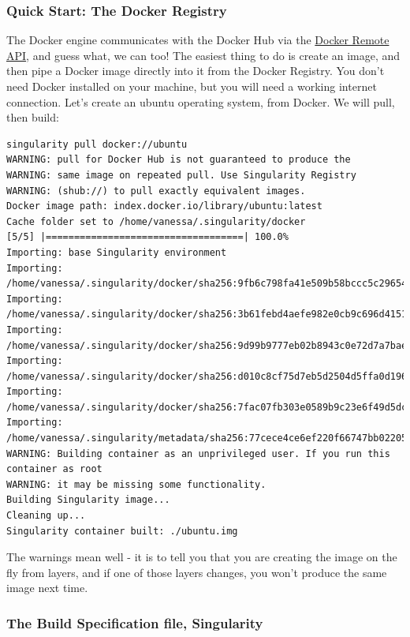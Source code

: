 \documentclass[a4paper]{article}
\begin{document}
\subsubsection{Quick Start: The Docker Registry}

The Docker engine communicates with the Docker Hub via the \href{https://docs.docker.com/engine/reference/api/docker_remote_api/}{Docker Remote API}, and guess what, we can too! The easiest thing to do is create an image, and then pipe a Docker image directly into it from the Docker Registry. You don’t need Docker installed on your machine, but you will need a working internet connection. Let’s create an ubuntu operating system, from Docker. We will pull, then build:\\[0.1in]

\begin{lstlisting}[frame=single] 
singularity pull docker://ubuntu
WARNING: pull for Docker Hub is not guaranteed to produce the
WARNING: same image on repeated pull. Use Singularity Registry
WARNING: (shub://) to pull exactly equivalent images.
Docker image path: index.docker.io/library/ubuntu:latest
Cache folder set to /home/vanessa/.singularity/docker
[5/5] |===================================| 100.0% 
Importing: base Singularity environment
Importing: /home/vanessa/.singularity/docker/sha256:9fb6c798fa41e509b58bccc5c29654c3ff4648b608f5daa67c1aab6a7d02c118.tar.gz
Importing: /home/vanessa/.singularity/docker/sha256:3b61febd4aefe982e0cb9c696d415137384d1a01052b50a85aae46439e15e49a.tar.gz
Importing: /home/vanessa/.singularity/docker/sha256:9d99b9777eb02b8943c0e72d7a7baec5c782f8fd976825c9d3fb48b3101aacc2.tar.gz
Importing: /home/vanessa/.singularity/docker/sha256:d010c8cf75d7eb5d2504d5ffa0d19696e8d745a457dd8d28ec6dd41d3763617e.tar.gz
Importing: /home/vanessa/.singularity/docker/sha256:7fac07fb303e0589b9c23e6f49d5dc1ff9d6f3c8c88cabe768b430bdb47f03a9.tar.gz
Importing: /home/vanessa/.singularity/metadata/sha256:77cece4ce6ef220f66747bb02205a00d9ca5ad0c0a6eea1760d34c744ef7b231.tar.gz
WARNING: Building container as an unprivileged user. If you run this container as root
WARNING: it may be missing some functionality.
Building Singularity image...
Cleaning up...
Singularity container built: ./ubuntu.img 
\end{lstlisting}

The warnings mean well - it is to tell you that you are creating the image on the fly from layers, and if one of those layers changes, you won’t produce the same image next time.

\subsubsection{The Build Specification file, Singularity}
\end{document}
